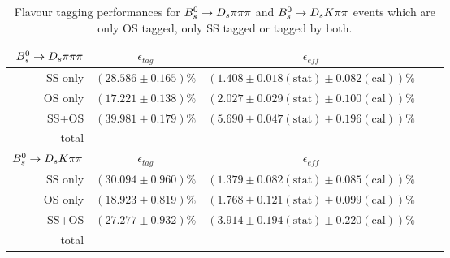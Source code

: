 \begin{table}
\centering
\begin{tabular}{rllll}
\hline \hline
${{B}^0_{s}}\rightarrow{\ensuremath{{D}_{s}}}{\ensuremath{\pi}}{\ensuremath{\pi}}{\ensuremath{\pi}}$ & \multicolumn{1}{c}{$\epsilon_{tag}$} & \multicolumn{1}{c}{$\epsilon_{eff}$} \\
\hline
SS only& $(28.586\pm0.165)\%$    & $(1.408\pm0.018(\textrm{stat})\pm0.082(\textrm{cal}))\%$\\
OS only& $(17.221\pm0.138)\%$     & $(2.027\pm0.029(\textrm{stat})\pm0.100(\textrm{cal}))\%$\\
SS+OS& $(39.981\pm0.179)\%$ & $(5.690\pm0.047(\textrm{stat})\pm0.196(\textrm{cal}))\%$\\
\hline
total & & \\
\hline \hline
${{B}^0_{s}}\rightarrow{\ensuremath{{D}_{s}}}{\ensuremath{K}}{\ensuremath{\pi}}{\ensuremath{\pi}}$ &  \multicolumn{1}{c}{$\epsilon_{tag}$} & \multicolumn{1}{c}{$\epsilon_{eff}$} \\
\hline
SS only& $(30.094\pm0.960)\%$    & $(1.379\pm0.082(\textrm{stat})\pm0.085(\textrm{cal}))\%$\\
OS only& $(18.923\pm0.819)\%$     & $(1.768\pm0.121(\textrm{stat})\pm0.099(\textrm{cal}))\%$\\
SS+OS& $(27.277\pm0.932)\%$ & $(3.914\pm0.194(\textrm{stat})\pm0.220(\textrm{cal}))\%$\\
\hline
total & & \\
\end{tabular}
\label{tab: TaggingPerformanceTab}
\caption{Flavour tagging performances for ${{B}^0_{s}}\rightarrow{\ensuremath{{D}_{s}}}{\ensuremath{\pi}}{\ensuremath{\pi}}{\ensuremath{\pi}}$ and ${{B}^0_{s}}\rightarrow{\ensuremath{{D}_{s}}}{\ensuremath{K}}{\ensuremath{\pi}}{\ensuremath{\pi}}$ events which are only OS tagged, only SS tagged or tagged by both.}
\end{table}
